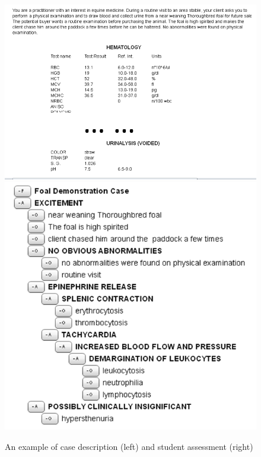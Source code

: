 \begin{figure}[ht]
\includegraphics[scale=0.5]{case-desc-small.png}
\includegraphics[scale=0.6]{student-work-small.png}
\caption{An example of case description (left) and student assessment (right)}
\label{fig:example}
\end{figure}

